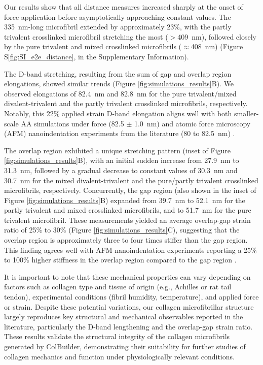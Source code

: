 \documentclass[10pt,letterpaper]{article}
\begin{document}
Our results show that all distance measures increased sharply at the onset of force application before asymptotically approaching constant values. The \SI{335}{\nano\meter}-long microfibril extended by approximately 23\%, with the partly trivalent crosslinked microfibril stretching the most (\(>\)\SI{409}{\nano\meter}), followed closely by the pure trivalent and mixed crosslinked microfibrils (\(\approx\)\SI{408}{\nano\meter}) (Figure S\ref{fig:SI_e2e_distance}, in the Supplementary Information).

The D-band stretching, resulting from the sum of gap and overlap region elongations, showed similar trends (Figure \ref{fig:simulations_results}B). We observed elongations of \SI{82.4}{\nano\meter} and \SI{82.8}{\nano\meter} for the pure trivalent/mixed divalent-trivalent and the partly trivalent crosslinked microfibrils, respectively. Notably, this 22\% applied strain D-band elongation aligns well with both smaller-scale AA simulations under force (\SI{82.5}{} \(\pm\) \SI{1.0}{\nano\meter}) and atomic force microscopy (AFM) nanoindentation experiments from the literature (\SI{80}{} to \SI{82.5}{\nano\meter}) \cite{rennekamp2023collagen, gachon2020stretching, peacock2019nanomechanical, minary2009nanomechanical}.

The overlap region exhibited a unique stretching pattern (inset of Figure \ref{fig:simulations_results}B), with an initial sudden increase from \SI{27.9}{\nano\meter} to \SI{31.3}{\nano\meter}, followed by a gradual decrease to constant values of \SI{30.3}{\nano\meter} and \SI{30.7}{\nano\meter} for the mixed divalent-trivalent and the pure/partly trivalent crosslinked microfibrils, respectively. Concurrently, the gap region (also shown in the inset of Figure \ref{fig:simulations_results}B) expanded from \SI{39.7}{\nano\meter} to \SI{52.1}{\nano\meter} for the partly trivalent and mixed crosslinked microfibrils, and to \SI{51.7}{\nano\meter} for the pure trivalent microfibril. These measurements yielded an average overlap-gap strain ratio of 25\% to 30\% (Figure \ref{fig:simulations_results}C), suggesting that the overlap region is approximately three to four times stiffer than the gap region. This finding agrees well with AFM nanoindentation experiments reporting a 25\% to 100\% higher stiffness in the overlap region compared to the gap region \cite{minary2009nanomechanical, peacock2019nanomechanical}.

It is important to note that these mechanical properties can vary depending on factors such as collagen type and tissue of origin (e.g., Achilles or rat tail tendon), experimental conditions (fibril humidity, temperature), and applied force or strain. Despite these potential variations, our collagen microfibrillar structure largely reproduces key structural and mechanical observables reported in the literature, particularly the D-band lengthening and the overlap-gap strain ratio. These results validate the structural integrity of the collagen microfibrils generated by ColBuilder, demonstrating their suitability for further studies of collagen mechanics and function under physiologically relevant conditions.
\end{document}
